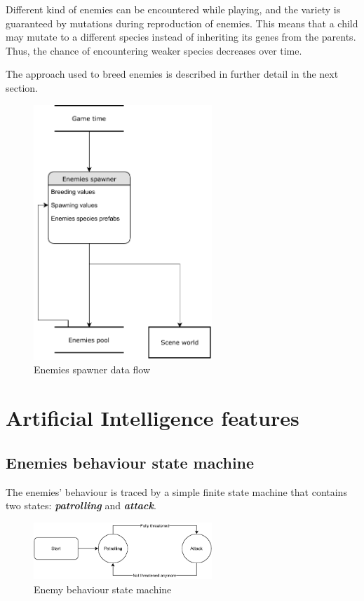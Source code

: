 \documentclass[11pt]{article}
\newcommand{\classname}[1]{\textit{\textbf{#1}}}
\begin{document}
Different kind of enemies can be encountered while playing, and the variety is guaranteed by mutations during reproduction of enemies. This means that a child may mutate to a different species instead of inheriting its genes from the parents. Thus, the chance of encountering weaker species decreases over time.

The approach used to breed enemies is described in further detail in the next section.

\begin{figure}[H]
  \centering
  \includegraphics[width=0.6\textwidth]{figures/enemies_spawner}
  \caption{Enemies spawner data flow}
\end{figure}

\section{Artificial Intelligence features}
\subsection{Enemies behaviour state machine}
The enemies' behaviour is traced by a simple finite state machine that contains two states: \classname{patrolling} and \classname{attack}.

\begin{figure}[H]
  \centering
  \includegraphics[width=0.6\textwidth]{figures/enemy_behaviour_states}
  \caption{Enemy behaviour state machine}
\end{figure}
\end{document}
